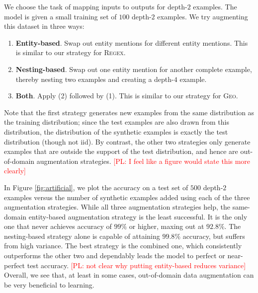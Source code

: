 \documentclass[11pt,letterpaper]{article}
\newcommand{\regex}{\textsc{Regex}\xspace}
\newcommand{\geo}{\textsc{Geo}\xspace}
\newcommand\pl[1]{\textcolor{red}{[PL: #1]}}
\begin{document}
We choose the task of mapping inputs to outputs for depth-$2$ examples.
The model is given a small training set of $100$ depth-$2$ examples.
We try augmenting this dataset in three ways:
\begin{enumerate}
  \item \textbf{Entity-based}.  
    Swap out entity mentions for different entity mentions.
    This is similar to our strategy for \regex.
  \item \textbf{Nesting-based}.  
    Swap out one entity mention for another complete example,
    thereby nesting two examples and creating a depth-$4$ example.
  \item \textbf{Both}.  
    Apply (2) followed by (1).
    This is similar to our strategy for \geo.
\end{enumerate}
Note that the first strategy generates new examples
from the same distribution as the training distribution;
since the test examples are also drawn from this distribution,
the distribution of the synthetic examples is exactly the test distribution
(though not iid).
By contrast, the other two strategies only generate examples that are
outside the support of the test distribution,
and hence are out-of-domain augmentation strategies.
\pl{I feel like a figure would state this more clearly}

In Figure \ref{fig:artificial}, we plot the accuracy on a test set 
of $500$ depth-$2$ examples versus the number of synthetic examples added
using each of the three augmentation strategies.
While all three augmentation strategies help,
the same-domain entity-based augmentation strategy is the least successful.
It is the only one that never achieves accuracy of $99\%$ or higher,
maxing out at $92.8\%$.
The nesting-based strategy alone is capable of attaining
$99.8\%$ accuracy, but suffers from high variance.
The best strategy is the combined one, which 
consistently outperforms the other two and 
dependably leads the model to perfect or near-perfect test accuracy.
\pl{not clear why putting entity-based reduces variance}
Overall, we see that, at least in some cases,
out-of-domain data augmentation can be very beneficial
to learning.
\end{document}
